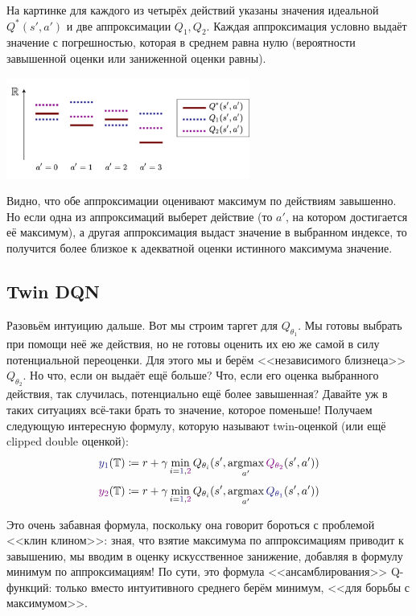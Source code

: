 \begin{example}
На картинке для каждого из четырёх действий указаны значения идеальной $Q^*(s', a')$ и две аппроксимации $Q_1, Q_2$. Каждая аппроксимация условно выдаёт значение с погрешностью, которая в среднем равна нулю (вероятности завышенной оценки или заниженной оценки равны).

\begin{center}
    \includegraphics[width=0.6\textwidth]{Images/OverestimationIssue.png}
\end{center}

Видно, что обе аппроксимации оценивают максимум по действиям завышенно. Но если одна из аппроксимаций выберет действие (то $a'$, на котором достигается её максимум), а другая аппроксимация выдаст значение в выбранном индексе, то получится более близкое к адекватной оценки истинного максимума значение.
\end{example}

\subsection{Twin DQN}\label{subsec:clippedtwin}

Разовьём интуицию дальше. Вот мы строим таргет для $Q_{\theta_1}$. Мы готовы выбрать при помощи неё же действия, но не готовы оценить их ею же самой в силу потенциальной переоценки. Для этого мы и берём <<независимого близнеца>> $Q_{\theta_2}$. Но что, если он выдаёт ещё больше? Что, если его оценка выбранного действия, так случилась, потенциально ещё более завышенная? Давайте уж в таких ситуациях всё-таки брать то значение, которое поменьше! Получаем следующую интересную формулу, которую называют twin-оценкой (или ещё clipped double оценкой):
$$\textcolor{ChadBlue}{y_1}(\T ) \coloneqq r + \gamma \min_{i = \textcolor{ChadBlue}{1}, \textcolor{ChadPurple}{2}}Q_{\theta_i}(s', \argmax\limits_{a'} \textcolor{ChadPurple}{Q_{\theta_2}}(s', a'))$$
$$\textcolor{ChadPurple}{y_2}(\T ) \coloneqq r + \gamma \min_{i = \textcolor{ChadBlue}{1}, \textcolor{ChadPurple}{2}}Q_{\theta_i}(s', \argmax\limits_{a'} \textcolor{ChadBlue}{Q_{\theta_1}}(s', a'))$$

Это очень забавная формула, поскольку она говорит бороться с проблемой <<клин клином>>: зная, что взятие максимума по аппроксимациям приводит к завышению, мы вводим в оценку искусственное занижение, добавляя в формулу минимум по аппроксимациям! По сути, это формула <<ансамблирования>> Q-функций: только вместо интуитивного среднего берём минимум, <<для борьбы с максимумом>>. 

